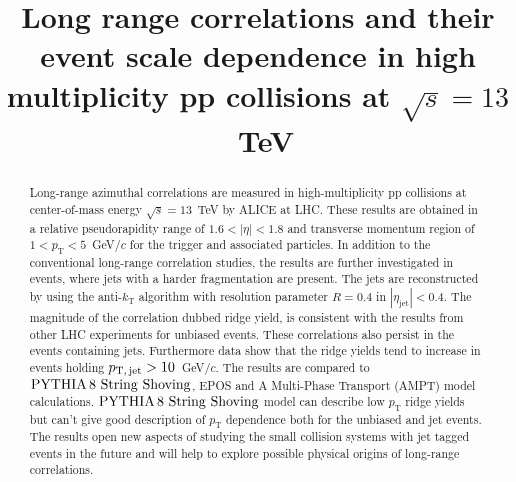 \documentclass[ALICE,manyauthors]{cernphprep}
\begin{document}
\begin{titlepage}

\PHyear{}
\PHdate{\today}
%

\title{Long range correlations and their event scale dependence in high multiplicity pp collisions at $\sqrt{s} = 13$~TeV}


\begin{abstract}
%

Long-range azimuthal correlations are measured in high-multiplicity pp collisions at center-of-mass energy $\sqrt{s} = 13$~TeV by ALICE at LHC. 
These results are obtained in a relative pseudorapidity range of $1.6 < |\eta| < 1.8$ and transverse momentum region of $1 < p_{\mathrm T} < 5$~GeV/$c$ for the trigger and associated particles.
In addition to the conventional long-range correlation studies, the results are further investigated in events, where jets with a harder fragmentation are present.
The jets are reconstructed by using the anti-$k_\mathrm{T}$ algorithm with resolution parameter $R=0.4$ in $|\eta_\mathrm{jet}|<0.4$. 
The magnitude of the correlation dubbed ridge yield, is consistent with the results from other LHC experiments for unbiased events. 
These correlations also persist in the events containing jets. Furthermore data show that the ridge yields tend to increase in events holding $p_\mathrm{T,\,jet} > 10$~GeV/$c$.
The results are compared to $\mathrm{PYTHIA}\,8~\mathrm{String}~\mathrm{Shoving}$, EPOS and A Multi-Phase Transport ({AMPT}) model calculations.  
$\mathrm{PYTHIA}\,8~\mathrm{String}~\mathrm{Shoving}$ model can describe low $p_{\mathrm T}$  ridge yields but can't give good description of $p_{\mathrm T}$ dependence both for the unbiased and jet events.
The results open new aspects of studying the small collision systems with jet tagged events in the future and will help to explore possible physical origins of long-range correlations.

\end{abstract}

\end{titlepage}
\end{document}
